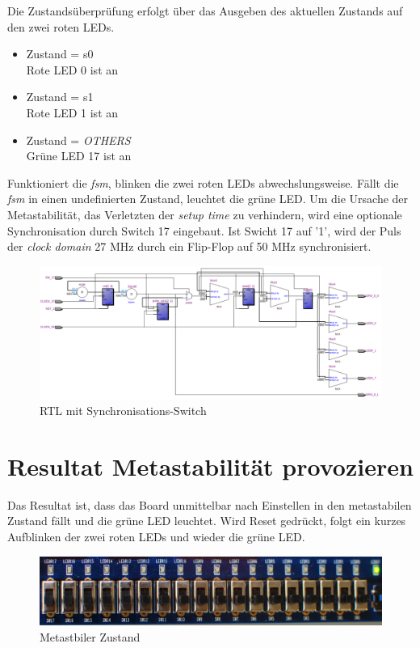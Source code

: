 Die Zustandsüberprüfung erfolgt über das Ausgeben des aktuellen Zustands auf den zwei roten LEDs. 

\begin{itemize}
	\item Zustand = s0\\
	Rote LED 0 ist an
	\item Zustand = s1\\
	 Rote LED 1 ist an
	\item Zustand = \textit{OTHERS}\\
	 Grüne LED 17 ist an\\
\end{itemize}

Funktioniert die \textit{fsm}, blinken die zwei roten LEDs abwechslungsweise. Fällt die \textit{fsm} in einen undefinierten Zustand, leuchtet die grüne LED. Um die Ursache der Metastabilität, das Verletzten der \textit{setup time} zu verhindern, wird eine optionale Synchronisation durch Switch 17 eingebaut. Ist Swicht 17  auf '1', wird der Puls der \textit{clock domain} 27 MHz durch ein Flip-Flop auf 50 MHz synchronisiert.

\begin{figure}[H]
	\includegraphics[width=1\textwidth]{images/metastability/RtL_metastaibility.png}
	\caption{RTL mit Synchronisations-Switch}
	\label{fig.metastabil.RtL}
\end{figure}

\newpage
\section{Resultat Metastabilität provozieren}\label{sect.meatastabil_proozieren}

Das Resultat ist, dass das Board unmittelbar nach Einstellen in den metastabilen Zustand fällt und die grüne LED leuchtet. Wird Reset gedrückt, folgt ein kurzes Aufblinken der zwei roten LEDs und wieder die grüne LED.

\begin{figure}[H]
	\includegraphics[width=1\textwidth]{images/metastability/metastabil.JPG}
	\caption{Metastbiler Zustand}
	\label{fig.metastabil.Ergebnis_Boardasynchron}
\end{figure}

